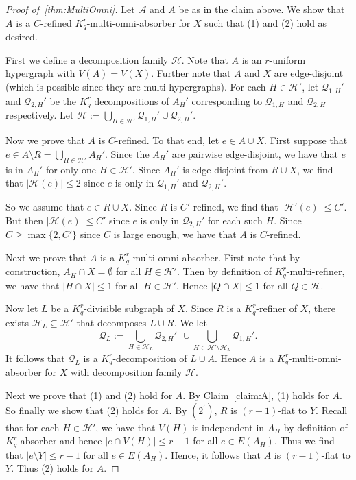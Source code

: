\documentclass[11pt]{article}
\newcounter{i}
\theoremstyle{plain}
\renewcommand{\theclaim}{\thetheorem.\arabic{claim}}
\newenvironment{lateproof}[1]
 {%
  \renewcommand{\theclaim}{\ref{#1}.\arabic{claim}}%
  \begin{proof}[Proof of~\cref{#1}]%
 }
 {\end{proof}}
\theoremstyle{plain} %
\theoremstyle{definition}
\begin{document}
\begin{lateproof}{thm:MultiOmni}
Let $\mathcal{A}$ and $A$ be as in the claim above. We show that $A$ is a $C$-refined $K_q^r$-multi-omni-absorber for $X$ such that (1) and (2) hold as desired. 

First we define a decomposition family $\mathcal{H}$. Note that $A$ is an $r$-uniform hypergraph with $V(A)=V(X)$. Further note that $A$ and $X$ are edge-disjoint (which is possible since they are multi-hypergraphs). For each $H\in \mathcal{H}'$, let $\mathcal{Q}_{1,H}'$ and $\mathcal{Q}_{2,H}'$ be the $K_q^r$ decompositions of $A_H'$ corresponding to $\mathcal{Q}_{1,H}$ and $\mathcal{Q}_{2,H}$ respectively. Let $\mathcal{H} := \bigcup_{H\in \mathcal{H}'} \mathcal{Q}_{1,H}'\cup \mathcal{Q}_{2,H}'$. 

Now we prove that $A$ is $C$-refined. To that end, let $e\in A\cup X$. First suppose that $e\in A\setminus R = \bigcup_{H\in \mathcal{H}'} A_H'$. Since the $A_H'$ are pairwise edge-disjoint, we have that $e$ is in $A_H'$ for only one $H\in \mathcal{H}'$. Since $A_H'$ is edge-disjoint from $R\cup X$, we find that $|\mathcal{H}(e)|\le 2$ since $e$ is only in $\mathcal{Q}_{1,H}'$ and $\mathcal{Q}_{2,H}'$.

So we assume that $e\in R\cup X$. Since $R$ is $C'$-refined, we find that $|\mathcal{H}'(e)|\le C'$. But then $|\mathcal{H}(e)|\le C'$ since $e$ is only in $\mathcal{Q}_{2,H}'$ for each such $H$. Since $C\ge \max\{2,C'\}$ since $C$ is large enough, we have that $A$ is $C$-refined.

Next we prove that $A$ is a $K_q^r$-multi-omni-absorber. First note that by construction, $A_H\cap X = \emptyset$ for all $H\in \mathcal{H}'$. Then by definition of $K_q^r$-multi-refiner, we have that $|H\cap X|\le 1$ for all $H\in \mathcal{H}'$. Hence $|Q\cap X|\le 1$ for all $Q\in \mathcal{H}$.

Now let $L$ be a $K_q^r$-divisible subgraph of $X$. Since $R$ is a $K_q^r$-refiner of $X$, there exists $\mathcal{H}_L \subseteq \mathcal{H}'$ that decomposes $L\cup R$.
We let
$$\mathcal{Q}_L:= \bigcup_{H\in \mathcal{H}_L} \mathcal{Q}_{2,H}'~~\cup \bigcup_{H\in \mathcal{H'}\setminus \mathcal{H}_L} \mathcal{Q}_{1,H}'.$$
It follows that $\mathcal{Q}_L$ is a $K_q^r$-decomposition of $L\cup A$. Hence $A$ is a $K_q^r$-multi-omni-absorber for $X$ with decomposition family $\mathcal{H}$. 


Next we prove that (1) and (2) hold for $A$. By Claim~\ref{claim:A}, (1) holds for $A$. So finally we show that (2) holds for $A$. By $(2^{\prime})$, $R$ is $(r-1)$-flat to $Y$. Recall that for each $H\in \mathcal{H}'$, we have that $V(H)$ is independent in $A_H$ by definition of $K_q^r$-absorber and hence $|e\cap V(H)|\le r-1$ for all $e\in E(A_H)$. Thus we find that $|e\setminus Y| \le r-1$ for all $e\in E(A_H)$. Hence, it follows that $A$ is $(r-1)$-flat to $Y$. Thus (2) holds for $A$. 
\end{lateproof}
\end{document}
